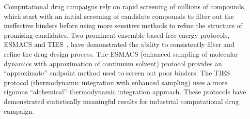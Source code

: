


Computational drug campaigns rely on rapid screening of millions of compounds,
which start with an initial screening of candidate compounds to filter out the
ineffective binders before using more sensitive methods to refine the
structure of promising candidates. Two  prominent ensemble-based  free energy
protocols, ESMACS and TIES~\cite{Bhati2017}, have demonstrated the  ability to
consistently filter and refine the drug design process. The ESMACS  (enhanced
sampling of molecular dynamics with approximation of continuum solvent)
protocol provides an ``approximate'' endpoint method used to screen out poor
binders. The TIES protocol (thermodynamic integration with enhanced sampling)
uses a more rigorous ``alchemical'' thermodynamic integration approach. These
protocols have demonstrated statistically meaningful results for industrial
computational drug campaign\cite{Wan2017brd4}.







 

